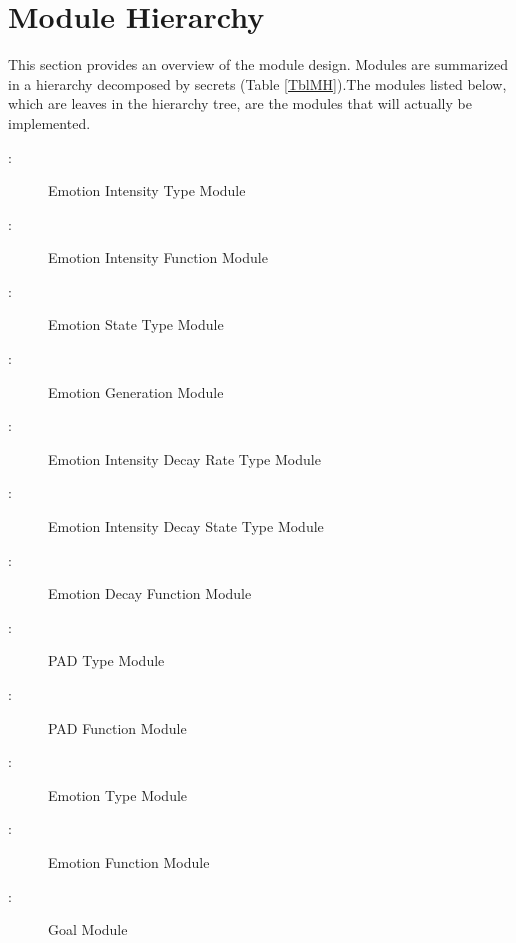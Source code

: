 \section{Module Hierarchy}\label{SecMH}
This section provides an overview of the module design. Modules are summarized
in a hierarchy decomposed by secrets (Table \ref{TblMH}).The modules listed
below, which are leaves in the hierarchy tree, are the modules that will
actually be implemented.

\begin{description}

    \item [ \mthemnum \label{mIntensity}:] Emotion
    Intensity Type Module

    \item [ \mthemnum \label{mIntensityFun}:] Emotion
    Intensity Function Module

    \item [ \mthemnum \label{mStateType}:] Emotion State
    Type Module

    \item [ \mthemnum \label{mGenerate}:] Emotion
    Generation Module

    \item [ \mthemnum \label{mDecay}:] Emotion Intensity
    Decay Rate Type Module

    \item [ \mthemnum \label{mDecayState}:] Emotion
    Intensity Decay State Type Module

    \item [ \mthemnum \label{mDecayFun}:] Emotion Decay
    Function Module

    \item [ \mthemnum \label{mPADType}:] PAD Type Module

    \item [ \mthemnum \label{mPADFun}:] PAD Function Module

    \item [ \mthemnum \label{mEmotionType}:] Emotion Type
    Module

    \item [ \mthemnum \label{mEmotionFun}:] Emotion
    Function Module

    \item [ \mthemnum \label{mGoal}:] Goal Module


\end{description}
